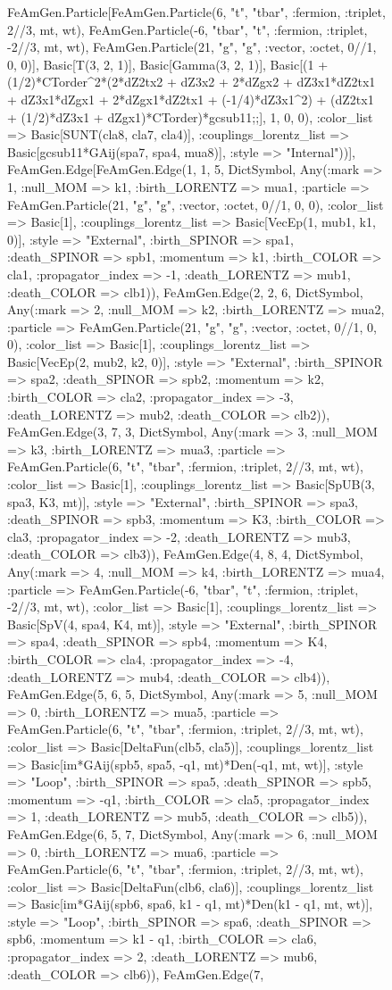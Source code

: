 \documentclass{revtex4}
\begin{document}
\begin{figure}[!htb]
\begin{center}
{FeAmGen.Particle[FeAmGen.Particle(6, "t", "tbar", :fermion, :triplet, 2//3, mt, wt), FeAmGen.Particle(-6, "tbar", "t", :fermion, :triplet, -2//3, mt, wt), FeAmGen.Particle(21, "g", "g", :vector, :octet, 0//1, 0, 0)], Basic[T(3, 2, 1)], Basic[Gamma(3, 2, 1)], Basic[(1 + (1/2)*CTorder^2*(2*dZ2tx2 + dZ3x2 + 2*dZgx2 + dZ3x1*dZ2tx1 + dZ3x1*dZgx1 + 2*dZgx1*dZ2tx1 + (-1/4)*dZ3x1^2) + (dZ2tx1 + (1/2)*dZ3x1 + dZgx1)*CTorder)*gcsub11;;], 1, 0, 0), :color_list => Basic[SUNT(cla8, cla7, cla4)], :couplings_lorentz_list => Basic[gcsub11*GAij(spa7, spa4, mua8)], :style => "Internal"))], FeAmGen.Edge[FeAmGen.Edge(1, 1, 5, Dict{Symbol, Any}(:mark => 1, :null_MOM => k1, :birth_LORENTZ => mua1, :particle => FeAmGen.Particle(21, "g", "g", :vector, :octet, 0//1, 0, 0), :color_list => Basic[1], :couplings_lorentz_list => Basic[VecEp(1, mub1, k1, 0)], :style => "External", :birth_SPINOR => spa1, :death_SPINOR => spb1, :momentum => k1, :birth_COLOR => cla1, :propagator_index => -1, :death_LORENTZ => mub1, :death_COLOR => clb1)), FeAmGen.Edge(2, 2, 6, Dict{Symbol, Any}(:mark => 2, :null_MOM => k2, :birth_LORENTZ => mua2, :particle => FeAmGen.Particle(21, "g", "g", :vector, :octet, 0//1, 0, 0), :color_list => Basic[1], :couplings_lorentz_list => Basic[VecEp(2, mub2, k2, 0)], :style => "External", :birth_SPINOR => spa2, :death_SPINOR => spb2, :momentum => k2, :birth_COLOR => cla2, :propagator_index => -3, :death_LORENTZ => mub2, :death_COLOR => clb2)), FeAmGen.Edge(3, 7, 3, Dict{Symbol, Any}(:mark => 3, :null_MOM => k3, :birth_LORENTZ => mua3, :particle => FeAmGen.Particle(6, "t", "tbar", :fermion, :triplet, 2//3, mt, wt), :color_list => Basic[1], :couplings_lorentz_list => Basic[SpUB(3, spa3, K3, mt)], :style => "External", :birth_SPINOR => spa3, :death_SPINOR => spb3, :momentum => K3, :birth_COLOR => cla3, :propagator_index => -2, :death_LORENTZ => mub3, :death_COLOR => clb3)), FeAmGen.Edge(4, 8, 4, Dict{Symbol, Any}(:mark => 4, :null_MOM => k4, :birth_LORENTZ => mua4, :particle => FeAmGen.Particle(-6, "tbar", "t", :fermion, :triplet, -2//3, mt, wt), :color_list => Basic[1], :couplings_lorentz_list => Basic[SpV(4, spa4, K4, mt)], :style => "External", :birth_SPINOR => spa4, :death_SPINOR => spb4, :momentum => K4, :birth_COLOR => cla4, :propagator_index => -4, :death_LORENTZ => mub4, :death_COLOR => clb4)), FeAmGen.Edge(5, 6, 5, Dict{Symbol, Any}(:mark => 5, :null_MOM => 0, :birth_LORENTZ => mua5, :particle => FeAmGen.Particle(6, "t", "tbar", :fermion, :triplet, 2//3, mt, wt), :color_list => Basic[DeltaFun(clb5, cla5)], :couplings_lorentz_list => Basic[im*GAij(spb5, spa5, -q1, mt)*Den(-q1, mt, wt)], :style => "Loop", :birth_SPINOR => spa5, :death_SPINOR => spb5, :momentum => -q1, :birth_COLOR => cla5, :propagator_index => 1, :death_LORENTZ => mub5, :death_COLOR => clb5)), FeAmGen.Edge(6, 5, 7, Dict{Symbol, Any}(:mark => 6, :null_MOM => 0, :birth_LORENTZ => mua6, :particle => FeAmGen.Particle(6, "t", "tbar", :fermion, :triplet, 2//3, mt, wt), :color_list => Basic[DeltaFun(clb6, cla6)], :couplings_lorentz_list => Basic[im*GAij(spb6, spa6, k1 - q1, mt)*Den(k1 - q1, mt, wt)], :style => "Loop", :birth_SPINOR => spa6, :death_SPINOR => spb6, :momentum => k1 - q1, :birth_COLOR => cla6, :propagator_index => 2, :death_LORENTZ => mub6, :death_COLOR => clb6)), FeAmGen.Edge(7, }
\end{center}
\end{figure}
\end{document}
